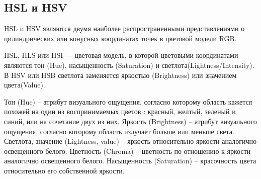 \subsection{HSL и HSV}
HSL и HSV являются двумя наиболее распространенными представлениями о цилиндрических или конусных координатах точек в цветовой модели RGB. 

HSL, HLS или HSI  — цветовая модель, в которой цветовыми координатами являются тон (Hue), насыщенность (Saturation) и светлота(Lightness/Intensity). В HSV или HSB светлота заменяется яркостью (Brightness) или значением цвета(Value).

\begin{figure}[ht!]
\end{figure}

Тон (Hue) -- атрибут визуального ощущения, согласно которому область кажется похожей на один из воспринимаемых цветов : красный, желтый, зеленый и синий, или на сочетание двух из них.
Яркость (Brightness) -- атрибут визуального ощущения, согласно которому область излучает больше или меньше света.
Светлота, значение (Lightness, value) -- яркость относительно яркости аналогично освещенного белого.
Цветность (Chroma) -- цветность по отношению к яркости аналогично освещенного белого.
Насыщенность (Saturation) -- красочность цвета относительно его собственной яркости.


